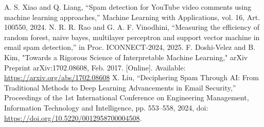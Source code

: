 \documentclass{article}
\begin{document}
\newline
\newline
[20] A. S. Xiao and Q. Liang, “Spam detection for YouTube video comments using machine learning approaches,” Machine Learning with Applications, vol. 16, Art. 100550, 2024.
\newline
\newline
[21] N. R. R. Rao and G. A. F. Vinodhini, “Measuring the efficiency of random forest, naive bayes, multilayer perceptron and support vector machine in email spam detection,” in Proc. ICONNECT-2024, 2025.
\newline
\newline
[22] F. Doshi-Velez and B. Kim, "Towards a Rigorous Science of Interpretable Machine Learning," arXiv Preprint arXiv:1702.08608, Feb. 2017. [Online]. Available: \url{https://arxiv.org/abs/1702.08608}
\newline
\newline
[23] X. Liu, “Deciphering Spam Through AI: From Traditional Methods to Deep Learning Advancements in Email Security,” Proceedings of the 1st International Conference on Engineering Management, Information Technology and Intelligence, pp. 553–558, 2024, doi: \url{https://doi.org/10.5220/0012958700004508}.


\newpage
\end{document}
